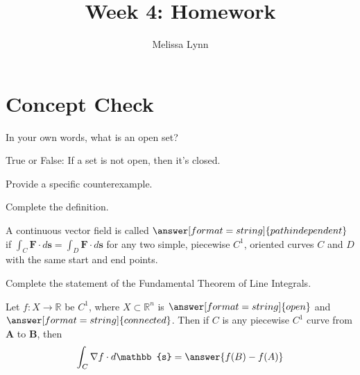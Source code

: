 \documentclass{ximera}
\title{Week 4: Homework}
\author{Melissa Lynn}
\begin{document}
  
\begin{abstract}  
\end{abstract}  
\maketitle

\section{Concept Check}

\begin{problem}
In your own words, what is an open set?
\begin{freeResponse}
\end{freeResponse}
\end{problem}

\begin{problem}
True or False: If a set is not open, then it's closed.
\begin{multipleChoice}
\end{multipleChoice}
\begin{problem}
Provide a specific counterexample.
\begin{freeResponse}
\end{freeResponse}
\end{problem}
\end{problem}

\begin{problem}
Complete the definition.

A continuous vector field is called $\answer[format=string]{path independent}$ if $\int_C\mathbf{F}\cdot d\mathbf{s} = \int_D\mathbf{F}\cdot d\mathbf{s}$ for any two simple, piecewise $C^1$, oriented curves $C$ and $D$ with the same start and end points.
\end{problem}

\begin{problem}
Complete the statement of the Fundamental Theorem of Line Integrals.

Let $f:X\rightarrow\mathbb{R}$ be $C^1$, where $X\subset\mathbb{R}^n$ is $\answer[format=string]{open}$ and $\answer[format=string]{connected}$. Then if $C$ is any piecewise $C^1$ curve from $\mathbf{A}$ to $\mathbf{B}$, then
\[
\int_C\nabla f\cdot d\mathbb{s} = \answer{f(B)-f(A)}
\]
\end{problem}
\end{document}
